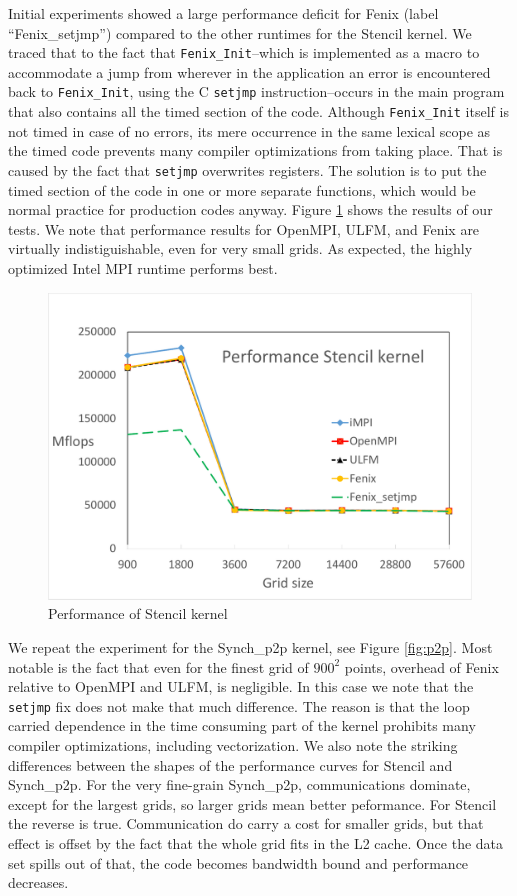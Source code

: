 Initial experiments showed a large performance deficit for Fenix (label ``Fenix\_setjmp'')
compared to the other runtimes for the Stencil kernel.
We traced that to the fact that \texttt{Fenix\_Init}--which is implemented as a macro to
accommodate a jump from wherever in the application an error is encountered back
to \texttt{Fenix\_Init}, using the C \texttt{setjmp} instruction--occurs in the
main program that also contains all the timed section of the code.
Although \texttt{Fenix\_Init} itself is not timed in case of no errors, its mere occurrence
in the same lexical scope as the timed code prevents many compiler optimizations from
taking place.
That is caused by the fact that \texttt{setjmp} overwrites registers.
The solution is to put the timed section of the code in one or more separate functions,
which would be normal practice for production codes anyway.
Figure \ref{fig:stencil} shows the results of our tests. We note that performance results
for OpenMPI, ULFM, and Fenix are virtually indistiguishable, even for very small grids.
As expected, the highly optimized Intel MPI runtime performs best.

\begin{figure}
  \centering
  \includegraphics[width=\columnwidth]{stencil_overheads-crop.pdf}
  \caption{Performance of Stencil kernel}
  \label{fig:stencil}
\end{figure}

We repeat the experiment for the Synch\_p2p kernel, see Figure \ref{fig:p2p}.
Most notable is the fact that even for the finest grid of $900^2$ points,
overhead of Fenix relative to OpenMPI and ULFM, is negligible.
In this case we note that the \texttt{setjmp} fix does not make that much
difference.
The reason is that the loop carried dependence in the time consuming part of
the kernel prohibits many compiler optimizations, including vectorization.
We also note the striking differences between the shapes of the performance
curves for Stencil and Synch\_p2p.
For the very fine-grain Synch\_p2p, communications dominate, except for the largest
grids, so larger grids mean better peformance.
For Stencil the reverse is true. Communication do carry a cost for smaller grids,
but that effect is offset by the fact that the whole grid fits in the L2 cache.
Once the data set spills out of that, the code becomes bandwidth bound and
performance decreases.

